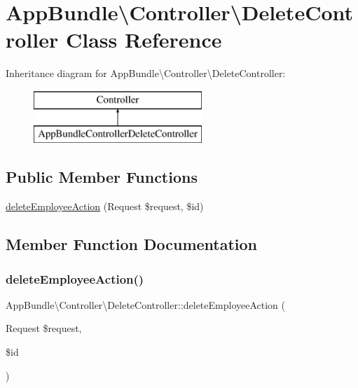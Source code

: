 \hypertarget{class_app_bundle_1_1_controller_1_1_delete_controller}{}\section{App\+Bundle\textbackslash{}Controller\textbackslash{}Delete\+Controller Class Reference}
\label{class_app_bundle_1_1_controller_1_1_delete_controller}
Inheritance diagram for App\+Bundle\textbackslash{}Controller\textbackslash{}Delete\+Controller\+:\begin{figure}[H]
\begin{center}
\leavevmode
\includegraphics[height=2.000000cm]{class_app_bundle_1_1_controller_1_1_delete_controller}
\end{center}
\end{figure}
\subsection*{Public Member Functions}
\begin{DoxyCompactItemize}
\item 
\mbox{\hyperlink{class_app_bundle_1_1_controller_1_1_delete_controller_accef083f570f50ff66688928c0a37102}{delete\+Employee\+Action}} (Request \$request, \$id)
\end{DoxyCompactItemize}


\subsection{Member Function Documentation}
\mbox{\label{class_app_bundle_1_1_controller_1_1_delete_controller_accef083f570f50ff66688928c0a37102}} 
\subsubsection{\texorpdfstring{delete\+Employee\+Action()}{deleteEmployeeAction()}}
{\footnotesize\ttfamily App\+Bundle\textbackslash{}\+Controller\textbackslash{}\+Delete\+Controller\+::delete\+Employee\+Action (\begin{DoxyParamCaption}\item[{Request}]{\$request,  }\item[{}]{\$id }\end{DoxyParamCaption})}

